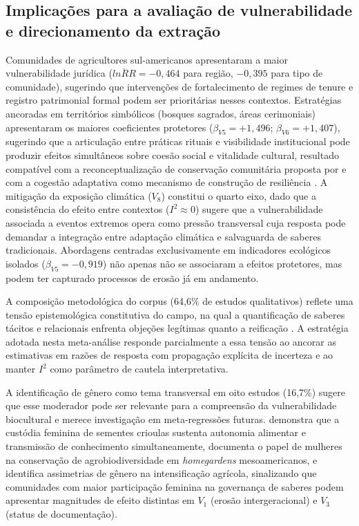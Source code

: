 \documentclass[12pt,a4paper]{article}
\begin{document}
\subsection{Implicações para a avaliação de vulnerabilidade e direcionamento da extração}
\label{sec:vulnerability-implications}

Comunidades de agricultores sul-americanos apresentaram a maior vulnerabilidade jurídica ($\overline{lnRR} = -0{,}464$ para região, $-0{,}395$ para tipo de comunidade), sugerindo que intervenções de fortalecimento de regimes de tenure e registro patrimonial formal podem ser prioritárias nesses contextos. Estratégias ancoradas em territórios simbólicos (bosques sagrados, áreas cerimoniais) apresentaram os maiores coeficientes protetores ($\beta_{V5} = +1{,}496$; $\beta_{V6} = +1{,}407$), sugerindo que a articulação entre práticas rituais e visibilidade institucional pode produzir efeitos simultâneos sobre coesão social e vitalidade cultural, resultado compatível com a reconceptualização de conservação comunitária proposta por \citet{Berkes2004} e com a cogestão adaptativa como mecanismo de construção de resiliência \citep{OlssonFolkeBerkes2004}. A mitigação da exposição climática ($V_8$) constitui o quarto eixo, dado que a consistência do efeito entre contextos ($I^2 \approx 0$) sugere que a vulnerabilidade associada a eventos extremos opera como pressão transversal cuja resposta pode demandar a integração entre adaptação climática e salvaguarda de saberes tradicionais. Abordagens centradas exclusivamente em indicadores ecológicos isolados ($\beta_{V5} = -0{,}919$) não apenas não se associaram a efeitos protetores, mas podem ter capturado processos de erosão já em andamento.

A composição metodológica do corpus (64,6\% de estudos qualitativos) reflete uma tensão epistemológica constitutiva do campo, na qual a quantificação de saberes tácitos e relacionais enfrenta objeções legítimas quanto a reificação \citep{Agrawal2002,GomezBaggethun2013}. A estratégia adotada nesta meta-análise responde parcialmente a essa tensão ao ancorar as estimativas em razões de resposta com propagação explícita de incerteza e ao manter $I^2$ como parâmetro de cautela interpretativa.

A identificação de gênero como tema transversal em oito estudos (16,7\%) sugere que esse moderador pode ser relevante para a compreensão da vulnerabilidade biocultural e merece investigação em meta-regressões futuras. \citet{Sibanda2025} demonstra que a custódia feminina de sementes crioulas sustenta autonomia alimentar e transmissão de conhecimento simultaneamente, \citet{RomeroSilva2026} documenta o papel de mulheres na conservação de agrobiodiversidade em \textit{homegardens} mesoamericanos, e \citet{MugiNgenga2016} identifica assimetrias de gênero na intensificação agrícola, sinalizando que comunidades com maior participação feminina na governança de saberes podem apresentar magnitudes de efeito distintas em $V_1$ (erosão intergeracional) e $V_3$ (status de documentação).
\end{document}
